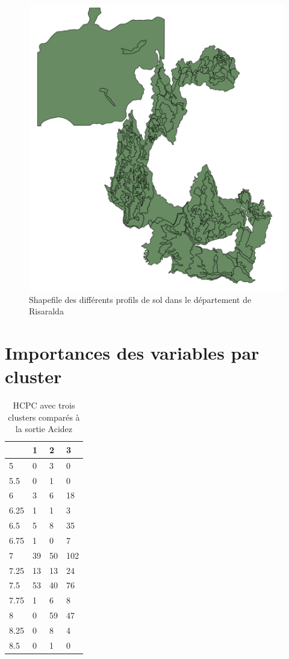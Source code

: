 \begin{figure}[H]
	\centering
	\caption{Shapefile des différents profils de sol dans le département de Risaralda}
	\label{fig:sigsoils}
	\includegraphics[width=0.7\linewidth]{img/Exploration/SIGsoils}
	
\end{figure}







\chapter{Importances des variables par cluster}
\label{annexe:clust}


\begin{table}[H]
	\centering
	\caption{HCPC avec trois clusters comparés à la sortie Acidez}
	\label{cluster3acidez}
	\begin{tabular}{llll}
		& 1  & 2  & 3   \\
		\hline
		5    & 0  & 3  & 0   \\
		5.5  & 0  & 1  & 0   \\
		6    & 3  & 6  & 18  \\
		6.25 & 1  & 1  & 3   \\
		6.5  & 5  & 8  & 35  \\
		6.75 & 1  & 0  & 7   \\
		7    & 39 & 50 & 102 \\
		7.25 & 13 & 13 & 24  \\
		7.5  & 53 & 40 & 76  \\
		7.75 & 1  & 6  & 8   \\
		8    & 0  & 59 & 47  \\
		8.25 & 0  & 8  & 4   \\
		8.5  & 0  & 1  & 0  
	\end{tabular}
\end{table}


